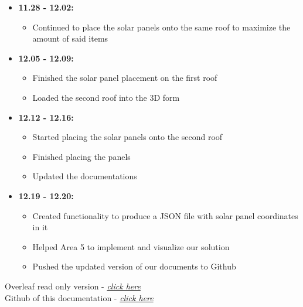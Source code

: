 \documentclass[a4paper,12pt,fleqn]{article}
\begin{document}
\begin{itemize}
    \item \textbf{11.28 - 12.02:}
    \begin{itemize}
        \item Continued to place the solar panels onto the same roof to maximize the amount of said items
    \end{itemize}
    
    \item \textbf{12.05 - 12.09:}
    \begin{itemize}
        \item Finished the solar panel placement on the first roof
        \item Loaded the second roof into the 3D form
    \end{itemize}
    
    \item \textbf{12.12 - 12.16:}
    \begin{itemize}
        \item Started placing the solar panels onto the second roof
        \item Finished placing the panels
        \item Updated the documentations
    \end{itemize}
    
    \item \textbf{12.19 - 12.20:}
    \begin{itemize}
        \item Created functionality to produce a JSON file with solar panel coordinates in it
        \item Helped Area 5 to implement and visualize our solution
        \item Pushed the updated version of our documents to Github
    \end{itemize}
    
    
\end{itemize}
Overleaf read only version - \textit{\href{https://www.overleaf.com/read/yfwwkrcvhxfk}{click here}}\\
Github of this documentation - \textit{\href{https://github.com/Jamtit/Documentation-Team3}{click here}}
\end{document}
